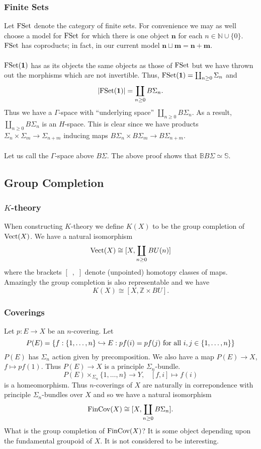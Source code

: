 \documentclass[11pt]{article}
\begin{document}
\begin{Jandr GammaCat notes}
\subsubsection{Finite Sets}
Let $\textup{FSet}$ denote the category of finite sets. For convenience we may as well choose a model for $\textup{FSet}$ for which there is one object $\textbf{n}$ for each $n\in\mathbb{N}\cup\{0\}$. $\textup{FSet}$ has coproducts; in fact, in our current model $\textbf{n}\sqcup\textbf{m}=\textbf{n}+\textbf{m}$.\\
\\
$\textup{FSet}(\textbf{1})$ has as its objects the same objects as those of $\textup{FSet}$ but we have thrown out the morphisms which are not invertible. Thus, $\textup{FSet}(\textbf{1})=\coprod_{n\geq 0}\Sigma_n$ and
\[\left|\textup{FSet}(\textbf{1})\right|=\coprod_{n\geq 0}B\Sigma_n.\]
Thus we have a $\Gamma$-space with ``underlying space'' $\coprod_{n\geq 0}B\Sigma_n$. As a result, $\coprod_{n\geq 0}B\Sigma_n$ is an $H$-space. This is clear since we have products $\Sigma_n\times\Sigma_m\to\Sigma_{n+m}$ inducing maps $B\Sigma_n\times B\Sigma_m\to B\Sigma_{n+m}$.\\
\\
Let us call the $\Gamma$-space above $B\Sigma$. The above proof shows that $\mathbb{B}B\Sigma\simeq\mathbb{S}$.

\subsection{Group Completion}
\subsubsection{$K$-theory}
When constructing $K$-theory we define $K(X)$ to be the group completion of $\textup{Vect}(X)$. We have a natural isomorphism
\[\textup{Vect}(X)\cong [X,\coprod_{n\geq 0} BU(n)]\]
where the brackets $[\hspace{6pt},\hspace{4pt}]$ denote (unpointed) homotopy classes of maps. Amazingly the group completion is also representable and we have
\[K(X)\cong [X,\mathbb{Z}\times BU].\]
\subsubsection{Coverings}
Let $p:E\to X$ be an $n$-covering. Let
\[
P(E)=
\left\{
f:\{1,\ldots,n\}\hookrightarrow E : 
pf(i)=pf(j) \textup{ for all } i,j\in\{1,\ldots,n\}
\right\}
\]
$P(E)$ has $\Sigma_n$ action given by precomposition. We also have a map $P(E)\to X$, $f\mapsto pf(1)$. Thus $P(E)\to X$ is a principle $\Sigma_n$-bundle.
\[P(E)\times_{\Sigma_n}\{1,\ldots,n\}\to Y,
\hspace{10pt}
[f,i]\mapsto f(i)\]
is a homeomorphism. Thus $n$-coverings of $X$ are naturally in correpondence with principle $\Sigma_n$-bundles over $X$ and so we have a natural isomorphism
\[\textup{FinCov}(X)\cong [X,\coprod_{n\geq 0}B\Sigma_n].\]
What is the group completion of $\textup{FinCov}(X)$? It is some object depending upon the fundamental groupoid of $X$. It is not considered to be interesting.

\end{Jandr GammaCat notes}
\end{document}
